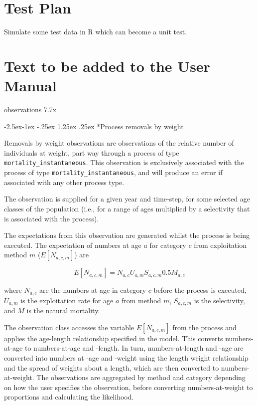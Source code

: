 \documentclass[a4paper,11pt,twoside,pdftex,draft]{article}
\makeatletter
\renewcommand\paragraph{\@startsection{paragraph}{4}{\z@}%
{-2.5ex\@plus -1ex \@minus -.25ex}%
{1.25ex \@plus .25ex}%
{\normalfont\normalsize\bfseries}}
\makeatother
\begin{document}
\section{Test Plan}

Simulate some test data in R which can become a unit test.

\section{Text to be added to the User Manual}

observations 7.7x

\paragraph*{Process removals by weight}

Removals by weight observations are observations of the relative number of individuals at weight, part way through a process of type \texttt{mortality\_instantaneous}. This observation is exclusively associated with the process of type \texttt{mortality\_instantaneous}, and will produce an error if associated with any other process type.

The observation is supplied for a given year and time-step, for some selected age classes of the population (i.e., for a range of ages multiplied by a selectivity that is associated with the process).

The expectations from this observation are generated whilst the process is being executed. The expectation of numbers at age $a$ for category $c$ from exploitation method $m$ ($E[N_{a,c,m}]$) are

\begin{equation}
E[N_{a,c,m}] = N_{a,c} U_{a,m} S_{a,c,m} 0.5 M_{a,c}
\end{equation}

where $N_{a,c}$ are the numbers at age in category $c$ before the process is executed, $U_{a,m}$ is the exploitation rate for age $a$ from method $m$, $S_{a,c,m}$ is the selectivity, and $M$ is the natural mortality.

The observation class accesses the variable $E[N_{a,c,m}]$ from the process and applies the age-length relationship specified in the model. This converts numbers-at-age to numbers-at-age and -length. In turn, numbers-at-length and -age are converted into numbers at -age and -weight using the length weight relationship and the spread of weights about a length, which are then converted to numbers-at-weight.  The observations are aggregated by method and category depending on how the user specifies the observation, before converting numbers-at-weight to proportions and calculating the likelihood.
\end{document}
